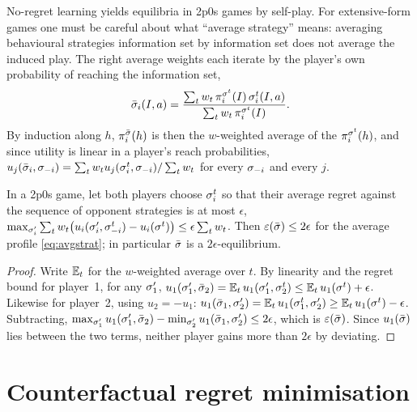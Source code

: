 No-regret learning yields equilibria in 2p0s games by self-play. For extensive-form games one must be careful about
what ``average strategy'' means: averaging behavioural strategies information set by information set does not average
the induced play. The right average weights each iterate by the player's own probability of reaching the
information set,
\begin{equation}\label{eq:avgstrat}
  \bar\sigma_i(I,a) = \frac{\sum_{t} w_t\, \pi^{\sigma^t}_i(I)\, \sigma^t_i(I,a)}{\sum_t w_t\, \pi^{\sigma^t}_i(I)}.
\end{equation}
By induction along $h$, $\pi^{\bar\sigma}_i(h)$ is then the $w$-weighted average of the $\pi^{\sigma^t}_i(h)$, and
since utility is linear in a player's reach probabilities, $u_j(\bar\sigma_i,\sigma_{-i}) = \sum_t w_t
u_j(\sigma^t_i,\sigma_{-i}) / \sum_t w_t$ for every $\sigma_{-i}$ and every $j$.

\begin{proposition}\label{prop:folk}
In a 2p0s game, let both players choose $\sigma^t_i$ so that their average regret against the sequence of opponent
strategies is at most $\epsilon$,
$\max_{\sigma_i'} \sum_t w_t \big(u_i(\sigma_i',\sigma^t_{-i}) - u_i(\sigma^t)\big) \le \epsilon \sum_t w_t$. Then
$\varepsilon(\bar\sigma) \le 2\epsilon$ for the average profile \eqref{eq:avgstrat}; in particular $\bar\sigma$ is a
$2\epsilon$-equilibrium.
\end{proposition}

\begin{proof}
Write $\mathbb{E}_t$ for the $w$-weighted average over $t$. By linearity and the regret bound for player~1, for any
$\sigma_1'$, $u_1(\sigma_1',\bar\sigma_2) = \mathbb{E}_t\, u_1(\sigma_1',\sigma_2^t) \le \mathbb{E}_t\, u_1(\sigma^t) + \epsilon$.
Likewise for player~2, using $u_2 = -u_1$: $u_1(\bar\sigma_1,\sigma_2') = \mathbb{E}_t\, u_1(\sigma_1^t,\sigma_2') \ge
\mathbb{E}_t\, u_1(\sigma^t) - \epsilon$. Subtracting, $\max_{\sigma_1'} u_1(\sigma_1',\bar\sigma_2) - \min_{\sigma_2'}
u_1(\bar\sigma_1,\sigma_2') \le 2\epsilon$, which is $\varepsilon(\bar\sigma)$. Since $u_1(\bar\sigma)$ lies between the two
terms, neither player gains more than $2\epsilon$ by deviating.
\end{proof}

\section{Counterfactual regret minimisation}\label{sec:cfr}


